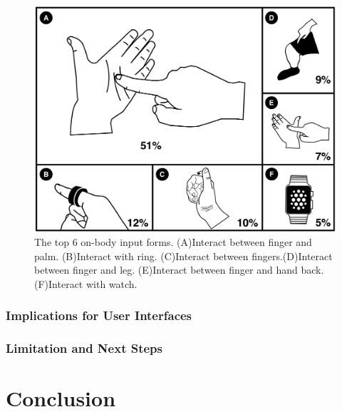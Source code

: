 \documentclass{sigchi}
\begin{document}
 \begin{figure}[!h]
  \centering
  \includegraphics[width=0.9\columnwidth]{OnBodyForms}
  \caption{The top 6 on-body input forms. (A)Interact between finger and palm. (B)Interact with ring. (C)Interact between fingers.(D)Interact between finger and leg. (E)Interact between finger and hand back. (F)Interact with watch.}
  \label{fig:figureOnBodyPorpotion}
  \end{figure}   

  \subsubsection{Implications for User Interfaces}
  \subsubsection{Limitation and Next Steps}


\section{Conclusion}


\end{document}
